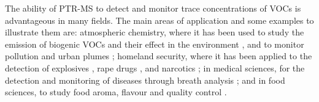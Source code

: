 The ability of PTR-MS to detect and monitor trace concentrations of VOCs is advantageous in many fields. The main areas of application and some examples to illustrate them are:
atmospheric chemistry, where it has been used to study the emission of biogenic VOCs and their effect in the environment \cite{doi:10.1029/2003JD003863}, and to  monitor pollution and urban plumes \cite{ROGERS200626};
homeland security, where it has been  applied to  the detection of explosives \cite{RN445,RN1254,doi:10.1021/acs.analchem.7b05211}, rape drugs \cite{doi:10.1002/jms.2993}, and narcotics \cite{Agarwal2011};
in medical sciences, for the detection and monitoring of diseases through breath analysis \cite{FERNANDEZDELRIO20151243,doi:10.1152/jappl.2001.91.2.762,amann2014};
and in food sciences, to study  food aroma, flavour and quality control \cite{doi:10.1021/jf020922g,doi:10.1021/jf803998c,doi:10.1002/jms.1797}.
















